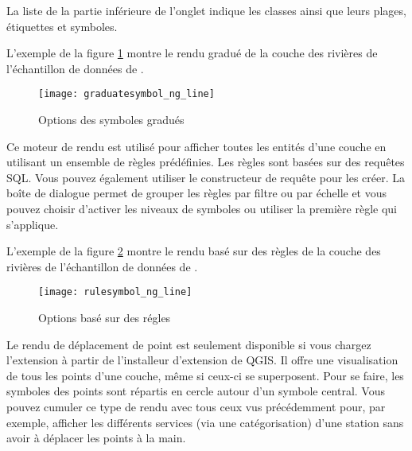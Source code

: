 La liste de la partie inférieure de l'onglet  indique les classes 
ainsi que leurs plages, étiquettes et symboles.

L'exemple de la figure \ref{fig:gradsymNG} montre le rendu gradué de la couche des rivières de l'échantillon de données de \qg.

\begin{figure}[ht]
   \centering
   \texttt{[image: graduatesymbol\_ng\_line]}
   \caption{Options des symboles gradués \nixcaption}\label{fig:gradsymNG}
\end{figure}


Ce moteur de rendu est utilisé pour afficher toutes les entités d'une 
couche en utilisant un ensemble de règles prédéfinies. Les règles sont basées 
sur des requêtes SQL. Vous pouvez également utiliser le constructeur de 
requête pour les créer. La boîte de dialogue permet de grouper les règles 
par filtre ou par échelle et vous pouvez choisir d'activer les niveaux de 
symboles ou utiliser la première règle qui s'applique.

L'exemple de la figure \ref{fig:rulesymNG} montre le rendu basé sur des règles 
de la couche des rivières de l'échantillon de données de \qg.

\begin{figure}[ht]
   \centering
   \texttt{[image: rulesymbol\_ng\_line]}
   \caption{Options basé sur des régles \nixcaption}\label{fig:rulesymNG}
\end{figure}


Le rendu de déplacement de point est seulement disponible si vous chargez
l'extension à partir de l'installeur d'extension de QGIS. Il offre une 
visualisation de tous les points d'une couche, même si ceux-ci se 
superposent. Pour se faire, les symboles des points sont répartis en 
cercle autour d'un symbole central. Vous pouvez cumuler ce type de 
rendu avec tous ceux vus précédemment pour, par exemple, afficher les 
différents services (via une catégorisation) d'une station sans avoir 
à déplacer les points à la main.

